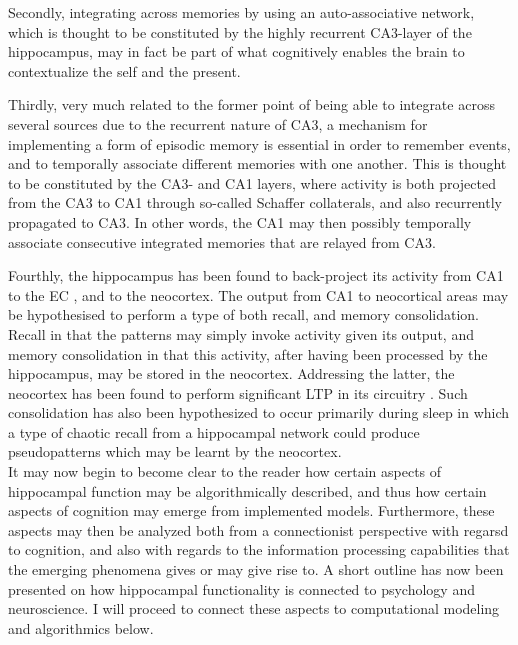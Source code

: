 Secondly, integrating across memories by using an auto-associative network, which is thought to be constituted by the highly recurrent CA3-layer of the hippocampus, may in fact be part of what cognitively enables the brain to contextualize the self and the present.

Thirdly, very much related to the former point of being able to integrate across several sources due to the recurrent nature of CA3, a mechanism for implementing a form of episodic memory is essential in order to remember events, and to temporally associate different memories with one another. This is thought to be constituted by the CA3- and CA1 layers, where activity is both projected from the CA3 to CA1 through so-called Schaffer collaterals, and also recurrently propagated to CA3. In other words, the CA1 may then possibly temporally associate consecutive integrated memories that are relayed from CA3.

Fourthly, the hippocampus has been found to back-project its activity from CA1 to the EC \citep{Rolls1998chpt6}, and to the neocortex. The output from CA1 to neocortical areas may be hypothesised to perform a type of both recall, and memory consolidation. Recall in that the patterns may simply invoke activity given its output, and memory consolidation in that this activity, after having been processed by the hippocampus, may be stored in the neocortex. Addressing the latter, the neocortex has been found to perform significant LTP in its circuitry \citep{Rolls1998chpt6}. Such consolidation has also been hypothesized to occur primarily during sleep \citep{French2001} in which a type of chaotic recall from a hippocampal network could produce pseudopatterns which may be learnt by the neocortex.
\\


It may now begin to become clear to the reader how certain aspects of hippocampal function may be algorithmically described, and thus how certain aspects of cognition may emerge from implemented models. Furthermore, these aspects may then be analyzed both from a connectionist perspective with regarsd to cognition, and also with regards to the information processing capabilities that the emerging phenomena gives or may give rise to. A short outline has now been presented on how hippocampal functionality is connected to psychology and neuroscience. I will proceed to connect these aspects to computational modeling and algorithmics below.

